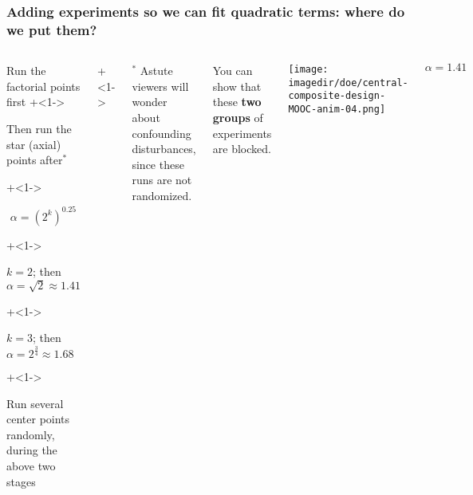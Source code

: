 \documentclass[handout,11pt,aspectratio=169,mathserif]{beamer}
\begin{document}
\begin{frame}\frametitle{Adding experiments so we can fit quadratic terms: where do we put them?}
	\begin{columns}[T]
		
			\vspace{1cm}
			
			\begin{itemize}
				\item	Run the factorial points first
				\onslide+<1->{
					\item	Then run the star (axial) points after$^\ast$
				}
				\onslide+<1->{
					\Large
					\[\alpha  = \left(2^k\right)^{0.25}\]
					
			
					\begin{itemize}
						\onslide+<1->{\item	$k = 2$; then $\alpha = \sqrt{2} \approx 1.41$ }
						\onslide+<1->{\item	$k = 3$; then $\alpha = 2^{\tfrac{3}{4}} \approx 1.68$}
					\end{itemize}
					\normalsize
				}
				\onslide+<1->{
					\item	Run several center points randomly, during the above two stages
				}
			\end{itemize}
			
			\onslide+<1->{
				\vspace{0cm}
				\tiny
				$^\ast$ Astute viewers will wonder about confounding disturbances, since these runs are not randomized.
			
				You can show that these {\color[rgb]{0,0.5,1}\textbf{two}} {\color[rgb]{0.5,0, 0.5}\textbf{groups}} of experiments are blocked.
			}
			
			
			\centerline{\texttt{[image: \\imagedir/doe/central-composite-design-MOOC-anim-04.png]}}
			
			\vspace{-0.5cm}
			\[\alpha = 1.41\]
	\end{columns}
\end{frame}
\end{document}
